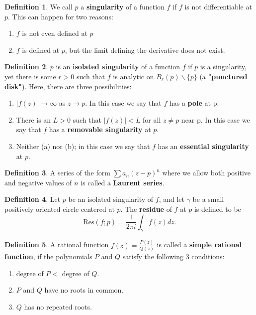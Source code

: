 \documentclass[a4paper]{article}
\theoremstyle{definition}
\newtheorem{definition}{Definition}
\begin{document}
	\begin{definition}
		We call $p$ a \textbf{singularity} of a function $f$ if $f$ is not differentiable at $p$. This can happen for two reasons:
		\begin{enumerate}[label=\alph*.]
			\item $f$ is not even defined at $p$
			\item $f$ is defined at $p$, but the limit defining the derivative does not exist.
		\end{enumerate}
	\end{definition}
	
	\begin{definition}
		$p$ is an \textbf{isolated singularity} of a function $f$ if $p$ is a singularity, yet there is some $r > 0$ such that $f$ is analytic on $B_{r}(p) \backslash \{p\}$ (a \textbf{"punctured disk"}). Here, there are three possibilities:
		\begin{enumerate}[label=\alph*.]
			\item $|f(z)| \rightarrow \infty$ as $z \rightarrow p$. In this case we say that $f$ has a \textbf{pole} at p.
			\item There is an $L > 0$ such that $|f(z)| < L$ for all $z \neq p$ near p. In this case we say that $f$ has a \textbf{removable singularity} at $p$.
			\item Neither (a) nor (b); in this case we say that $f$ has an \textbf{essential singularity} at $p$.
		\end{enumerate}
	\end{definition}
	
	\begin{definition}
		A series of the form $\sum a_{n} (z-p)^{n}$ where we allow both positive and negative values of $n$ is called a \textbf{Laurent series}.
	\end{definition}
	
	\begin{definition}
		Let $p$ be an isolated singularity of $f$, and let $\gamma$ be a small positively oriented circle centered at $p$. The \textbf{residue} of $f$ at $p$ is defined to be
		$$\text{Res}(f;p) = \frac{1}{2 \pi i} \int_{\gamma} f(z) dz.$$
	\end{definition}
	
	\begin{definition}
		A rational function $f(z) = \frac{P(z)}{Q(z)}$ is called a \textbf{simple rational function}, if the polynomials $P$ and $Q$ satisfy the following 3 conditions:
		\begin{enumerate}[label=\alph*.]
			\item degree of $P <$ degree of $Q$.
			\item $P$ and $Q$ have no roots in common.
			\item $Q$ has no repeated roots.
		\end{enumerate}
	\end{definition}
	
\end{document}
